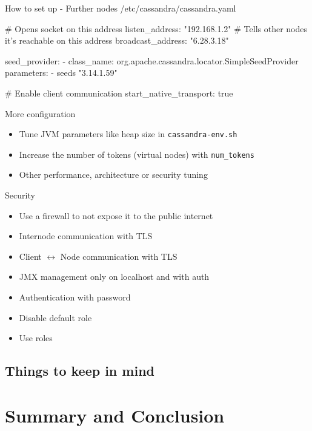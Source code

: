\documentclass[
  10pt
]{beamer}
\begin{document}
\begin{frame}[fragile]{How to set up - Further nodes}
  /etc/cassandra/cassandra.yaml
  \begin{semiverbatim}
# Opens socket on this address
listen_address: "192.168.1.2"
# Tells other nodes it's reachable on this address
broadcast_address: "6.28.3.18"

seed_provider:
  - class_name: org.apache.cassandra.locator.SimpleSeedProvider
    parameters:
      - seeds "3.14.1.59"

# Enable client communication
start_native_transport: true
  \end{semiverbatim}
\end{frame}

\begin{frame}{More configuration}
  \begin{itemize}
    \item Tune JVM parameters like heap size in \lstinline{cassandra-env.sh}
    \item Increase the number of tokens (virtual nodes) with \lstinline{num_tokens}
    \item Other performance, architecture or security tuning
  \end{itemize}
\end{frame}

\begin{frame}{Security}
  \begin{itemize}
    \item<1-> Use a firewall to not expose it to the public internet
    \item<2-> Internode communication with TLS
    \item<2-> Client $\leftrightarrow$ Node communication with TLS
    \item<3-> JMX management only on localhost and with auth
    \item<4-> Authentication with password
    \item<5-> Disable default role
    \item<5-> Use roles
  \end{itemize}
\end{frame}

\subsection{Things to keep in mind}

\section{Summary and Conclusion}
\end{document}
